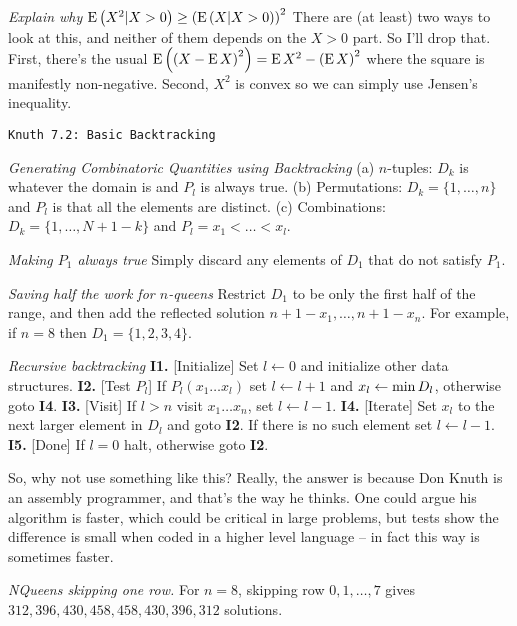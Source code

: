  {\it Explain why ${\rm E}\left(X^2 | X > 0\right) \geq 
\left({\rm E} \left(X | X > 0\right)\right)^2$}\hfil\break
There are (at least) two ways to look at this, and neither of them depends on the $X > 0$
part.  So I'll drop that.  First, there's the usual ${\rm E}\left( \left(X - {\rm E} \, X\right)^2 \right) =
{\rm E} \, X^2 - \left({\rm E}\, X\right)^2$ where the square is manifestly non-negative.
Second, $X^2$ is convex so we can simply use Jensen's inequality.

\topglue 0.5in
\centerline{\tt Knuth 7.2: Basic Backtracking}
\vskip 0.3in

 {\it Generating Combinatoric Quantities using 
Backtracking}\hfil\break
(a) $n$-tuples: $D_k$ is whatever the domain is and $P_l$ is always 
true.\hfil\break 
(b) Permutations: $D_k = \{ 1, \ldots, n \}$ and $P_l$ is that all the elements 
are distinct.\hfil\break
(c) Combinations: $D_k = \{1, \ldots, N + 1 - k \}$ and 
$P_l = x_1 < \ldots < x_l$.\hfil\break

 {\it Making $P_1$ always true}\hfil\break
Simply discard any elements of $D_1$ that do not satisfy $P_1$.

 {\it Saving half the work for $n$-queens}\hfil\break
Restrict $D_1$ to be only the first half of the range, and then add the 
reflected solution $n + 1 - x_1, \ldots, n + 1 - x_n$.  For example, if $n = 8$
then $D_1 = \{1, 2, 3, 4\}$.

 {\it Recursive backtracking}\hfil\break
{\bf I1.} [Initialize] Set $l \leftarrow 0$ and initialize other data 
structures.\hfil\break
{\bf I2.} [Test $P_l$] If $P_l\left(x_1 \ldots x_l\right)$ set 
 $l \leftarrow l + 1$ and $x_l \leftarrow {\rm min}\,D_l$,
  otherwise goto {\bf I4}.\hfil\break 
{\bf I3.} [Visit] If $l > n$ visit $x_1 \ldots x_n$, set $l \leftarrow l-1$.
\hfil\break
{\bf I4.} [Iterate] Set $x_l$ to the next larger element in $D_l$ and goto 
 {\bf I2}. If there is no such element set $l \leftarrow l - 1$.\hfil\break
{\bf I5.} [Done] If $l=0$ halt, otherwise goto {\bf I2}.
\hfil\break

So, why not use something like this?  Really, the answer is because Don Knuth
is an assembly programmer, and that's the way he thinks.  One could argue his
algorithm is faster, which could be critical in large problems, but tests show
the difference is small when coded in a higher level language -- in fact this
way is sometimes faster.

 {\it NQueens skipping one row.}\hfil\break
For $n=8$, skipping row $0, 1, \ldots, 7$ gives ${312, 396,
430, 458, 458, 430, 396, 312}$ solutions.

